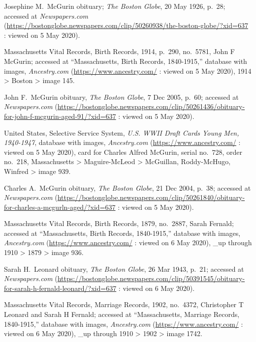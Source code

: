 \begin{thebibliography}{999}
	Josephine M.\ McGurin obituary; \textit{The Boston Globe}, 20 May 1926, p.\ 28; accessed at \textit{Newspapers.com} (\url{https://bostonglobe.newspapers.com/clip/50260938/the-boston-globe/?xid=637} : viewed on 5 May 2020).
	
	Massachusetts Vital Records, Birth Records, 1914, p.\ 290, no.\ 5781, John F McGurin; accessed at ``Massachusetts, Birth Records, 1840-1915,'' database with images, \textit{Ancestry.com} (\url{https://www.ancestry.com/} : viewed on 5 May 2020), 1914 > Boston > image 145.	
	
	John F.\ McGurin obituary, \textit{The Boston Globe}, 7 Dec 2005, p.\ 60; accessed at \textit{Newspapers.com} (\url{https://bostonglobe.newspapers.com/clip/50261436/obituary-for-john-f-mcgurin-aged-91/?xid=637} : viewed on 5 May 2020).
	
	United States, Selective Service System, \textit{U.S. WWII Draft Cards Young Men, 1940-1947}, database with images, \textit{Ancestry.com} (\url{https://www.ancestry.com/} : viewed on 5 May 2020), card for Charles Alfred McGurin, serial no.\ 728, order no.\ 218, Massachusetts > Maguire-McLeod > McGuillan, Roddy-McHugo, Winfred > image 939.
	
	Charles A.\ McGurin obituary, \textit{The Boston Globe}, 21 Dec 2004, p.\ 38; accessed at \textit{Newspapers.com} (\url{https://bostonglobe.newspapers.com/clip/50261840/obituary-for-charles-a-mcgurln-aged/?xid=637} : viewed on 5 May 2020).
	
	Massachusetts Vital Records, Birth Records, 1879, no.\ 2887, Sarah Fernald; accessed at ``Massachusetts, Birth Records, 1840-1915,'' database with images, \textit{Ancestry.com} (\url{https://www.ancestry.com/} : viewed on 6 May 2020), \_up through 1910 > 1879 > image 936.
	
	Sarah H.\ Leonard obituary, \textit{The Boston Globe}, 26 Mar 1943, p.\ 21; accessed at \textit{Newspapers.com} (\url{https://bostonglobe.newspapers.com/clip/50391545/obituary-for-sarah-h-fernald-leonard/?xid=637} : viewed on 6 May 2020).
	
	Massachusetts Vital Records, Marriage Records, 1902, no.\ 4372, Christopher T Leonard and Sarah H Fernald; accessed at ``Massachusetts, Marriage Records, 1840-1915,'' database with images, \textit{Ancestry.com} (\url{https://www.ancestry.com/} : viewed on 6 May 2020), \_up through 1910 > 1902 > image 1742.
	

\end{thebibliography}
